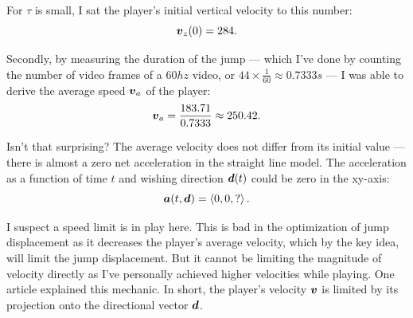 For $\tau$ is small, I sat the player's initial vertical velocity to this number:
\[
    \boldsymbol{v}_{z}(0) = 284.
\]

Secondly, by measuring the duration of the jump --- which I've done by counting the number of video frames of a $60\si{hz}$ video, or $44 \times \frac{1}{60} \approx 0.7333 \si{s}$ --- I was able to derive the average speed $\boldsymbol{v}_{a}$ of the player:
\[
    \boldsymbol{v}_{a} = \frac{183.71}{0.7333} \approx 250.42.
\]

Isn't that surprising? The average velocity does not differ from its initial value --- there is almost a zero net acceleration in the straight line model. The acceleration as a function of time $t$ and wishing direction $\boldsymbol{d}(t)$ could be zero in the xy-axis:
\[
    \boldsymbol{a}(t, \boldsymbol{d}) = \left\langle 0, 0, ? \right\rangle.
\]

I suspect a speed limit is in play here. This is bad in the optimization of jump displacement as it decreases the player's average velocity, which by the key idea, will limit the jump displacement. But it cannot be limiting the magnitude of velocity directly as I've personally achieved higher velocities while playing. One article explained this mechanic. In short, the player's velocity $\boldsymbol{v}$ is limited by its projection onto the directional vector $\boldsymbol{d}$.

